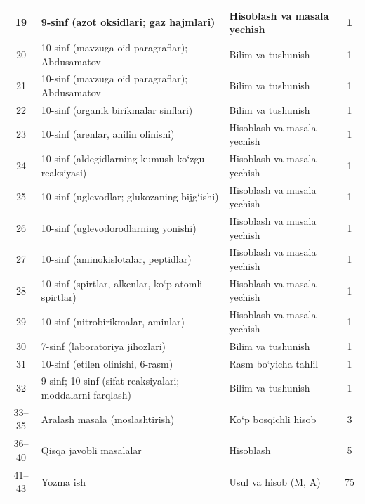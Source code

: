 \documentclass[11pt,a4paper]{article}
\begin{document}
{\begin{longtable}{|c|p{7.2cm}|p{5.4cm}|c|}
19 & 9-sinf (azot oksidlari; gaz hajmlari) & Hisoblash va masala yechish & 1\\\hline
20 & 10-sinf (mavzuga oid paragraflar); Abdusamatov & Bilim va tushunish & 1\\\hline
21 & 10-sinf (mavzuga oid paragraflar); Abdusamatov & Bilim va tushunish & 1\\\hline
22 & 10-sinf (organik birikmalar sinflari) & Bilim va tushunish & 1\\\hline
23 & 10-sinf (arenlar, anilin olinishi) & Hisoblash va masala yechish & 1\\\hline
24 & 10-sinf (aldegidlarning kumush ko`zgu reaksiyasi) & Hisoblash va masala yechish & 1\\\hline
25 & 10-sinf (uglevodlar; glukozaning bijg`ishi) & Hisoblash va masala yechish & 1\\\hline
26 & 10-sinf (uglevodorodlarning yonishi) & Hisoblash va masala yechish & 1\\\hline
27 & 10-sinf (aminokislotalar, peptidlar) & Hisoblash va masala yechish & 1\\\hline
28 & 10-sinf (spirtlar, alkenlar, ko`p atomli spirtlar) & Hisoblash va masala yechish & 1\\\hline
29 & 10-sinf (nitrobirikmalar, aminlar) & Hisoblash va masala yechish & 1\\\hline
30 & 7-sinf (laboratoriya jihozlari) & Bilim va tushunish & 1\\\hline
31 & 10-sinf (etilen olinishi, 6-rasm) & Rasm bo`yicha tahlil & 1\\\hline
32 & 9-sinf; 10-sinf (sifat reaksiyalari; moddalarni farqlash) & Bilim va tushunish & 1\\\hline
33--35 & Aralash masala (moslashtirish) & Ko`p bosqichli hisob & 3\\\hline
36--40 & Qisqa javobli masalalar & Hisoblash & 5\\\hline
41--43 & Yozma ish & Usul va hisob (M, A) & 75\\\hline
\end{longtable}}
\end{document}
